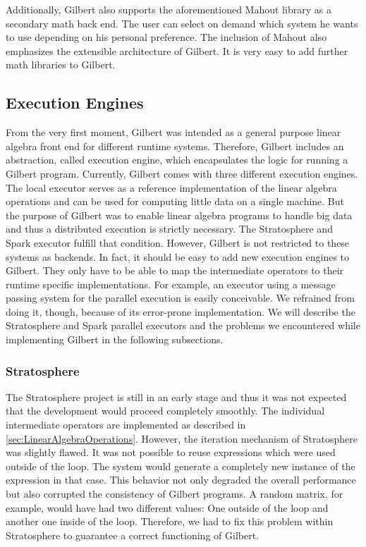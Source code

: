 Additionally, Gilbert also supports the aforementioned Mahout library as a secondary math back end.
The user can select on demand which system he wants to use depending on his personal preference.
The inclusion of Mahout also emphasizes the extensible architecture of Gilbert.
It is very easy to add further math libraries to Gilbert.

\subsection{Execution Engines}

From the very first moment, Gilbert was intended as a general purpose linear algebra front end for different runtime systems.
Therefore, Gilbert includes an abstraction, called execution engine, which encapsulates the logic for running a Gilbert program.
Currently, Gilbert comes with three different execution engines.
The local executor serves as a reference implementation of the linear algebra operations and can be used for computing little data on a single machine.
But the purpose of Gilbert was to enable linear algebra programs to handle big data and thus a distributed execution is strictly necessary.
The Stratosphere and Spark executor fulfill that condition.
However, Gilbert is not restricted to these systems as backends.
In fact, it should be easy to add new execution engines to Gilbert.
They only have to be able to map the intermediate operators to their runtime specific implementations.
For example, an executor using a message passing system for the parallel execution is easily conceivable.
We refrained from doing it, though, because of its error-prone implementation.
We will describe the Stratosphere and Spark parallel executors and the problems we encountered while implementing Gilbert in the following subsections.

\subsubsection{Stratosphere}

The Stratosphere project is still in an early stage and thus it was not expected that the development would proceed completely smoothly.
The individual intermediate operators are implemented as described in \cref{sec:LinearAlgebraOperations}.
However, the iteration mechanism of Stratosphere was slightly flawed.
It was not possible to reuse expressions which were used outside of the loop.
The system would generate a completely new instance of the expression in that case.
This behavior not only degraded the overall performance but also corrupted the consistency of Gilbert programs.
A random matrix, for example, would have had two different values: One outside of the loop and another one inside of the loop.
Therefore, we had to fix this problem within Stratosphere to guarantee a correct functioning of Gilbert.

